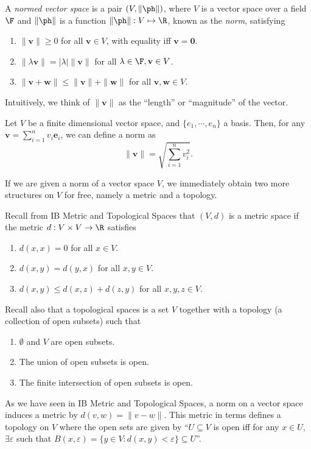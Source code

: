 \documentclass[a4paper]{article}
\begin{document}
\begin{defi}
  A \emph{normed vector space} is a pair $(V, \|\ph \|)$, where $V$ is a vector space over a field $\F$ and $\|\ph \|$ is a function $\|\ph \|: V \mapsto \R$, known as the \emph{norm}, satisfying
  \begin{enumerate}
    \item $\|\mathbf{v}\| \geq 0$ for all $\mathbf{v}\in V$, with equality iff $\mathbf{v} = \mathbf{0}$.
    \item $\| \lambda \mathbf{v}\| = |\lambda| \|\mathbf{v}\|$ for all $\lambda \in \F, \mathbf{v}\in V$.
    \item $\|\mathbf{v} + \mathbf{w}\| \leq \|\mathbf{v}\| + \|\mathbf{w}\|$ for all $\mathbf{v}, \mathbf{w} \in V$.
  \end{enumerate}
\end{defi}
Intuitively, we think of $\|\mathbf{v}\|$ as the ``length'' or ``magnitude'' of the vector.

\begin{eg}
  Let $V$ be a finite dimensional vector space, and $\{e_1, \cdots, e_n\}$ a basis. Then, for any $\mathbf{v} = \sum_{i = 1}^n v_i \mathbf{e}_i$, we can define a norm as
  \[
    \|\mathbf{v}\| = \sqrt{\sum_{i = 1}^n v_i^2}.
  \]
\end{eg}

If we are given a norm of a vector space $V$, we immediately obtain two more structures on $V$ for free, namely a metric and a topology.

Recall from IB Metric and Topological Spaces that $(V, d)$ is a metric space if the metric $d: V\times V \to \R$ satisfies
\begin{enumerate}
  \item $d(x, x) = 0$ for all $x\in V$.
  \item $d(x, y) = d(y, x)$ for all $x, y\in V$.
  \item $d(x, y) \leq d(x, z) + d(z, y)$ for all $x, y, z\in V$.
\end{enumerate}
Recall also that a topological spaces is a set $V$ together with a topology (a collection of open subsets) such that
\begin{enumerate}
  \item $\emptyset$ and $V$ are open subsets.
  \item The union of open subsets is open.
  \item The finite intersection of open subsets is open.
\end{enumerate}
As we have seen in IB Metric and Topological Spaces, a norm on a vector space induces a metric by $d(v, w) = \|v - w\|$. This metric in terms defines a topology on $V$ where the open sets are given by ``$U\subseteq V$ is open iff for any $x\in U$, $\exists \varepsilon$ such that $B(x, \varepsilon) = \{y\in V: d(x, y) < \varepsilon\}\subseteq U$''.
\end{document}
